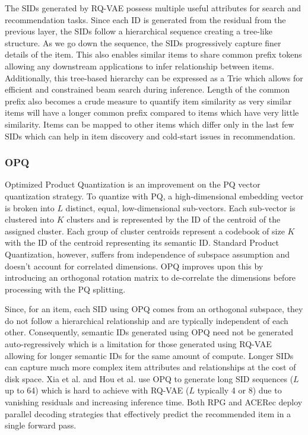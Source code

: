 \documentclass[11pt,a4paper]{article}
\begin{document}
The SIDs generated by RQ-VAE possess multiple useful attributes for search and recommendation tasks. Since each ID is generated from the residual from the previous layer, the SIDs follow a hierarchical sequence creating a tree-like structure. As we go down the sequence, the SIDs progressively capture finer details of the item. This also enables similar items to share common prefix tokens allowing any downstream applications to infer relationship between items. Additionally, this tree-based hierarchy can be expressed as a Trie which allows for efficient and constrained beam search during inference. Length of the common prefix also becomes a crude measure to quantify item similarity as very similar items will have a longer common prefix compared to items which have very little similarity. Items can be mapped to other items which differ only in the last few SIDs which can help in item discovery and cold-start issues in recommendation.

\subsubsection{OPQ}
Optimized Product Quantization is an improvement on the PQ vector quantization strategy. To quantize with PQ, a high-dimensional embedding vector is broken into $L$ distinct, equal, low-dimensional sub-vectors. Each sub-vector is clustered into $K$ clusters and is represented by the ID of the centroid of the assigned cluster. Each group of cluster centroids represent a codebook of size $K$ with the ID of the centroid representing its semantic ID. Standard Product Quantization, however, suffers from independence of subspace assumption and doesn't account for correlated dimensions. OPQ \cite{OPQ} improves upon this by introducing an orthogonal rotation matrix to de-correlate the dimensions before processing with the PQ splitting.

Since, for an item, each SID using OPQ comes from an orthogonal subspace, they do not follow a hierarchical relationship and are typically independent of each other. Consequently, semantic IDs generated using OPQ need not be generated auto-regressively which is a limitation for those generated using RQ-VAE allowing for longer semantic IDs for the same amount of compute. Longer SIDs can capture much more complex item attributes and relationships at the cost of disk space. Xia et al. \cite{2026ACERec_xia2026unleashpotentiallongsemantic} and Hou et al. \cite{2025RPG_hou2025generatinglongsemanticids} use OPQ to generate long SID sequences ($L$ up to 64) which is hard to achieve with RQ-VAE ($L$ typically 4 or 8) due to vanishing residuals and increasing inference time. Both RPG and ACERec deploy parallel decoding strategies that effectively predict the recommended item in a single forward pass.
\end{document}

